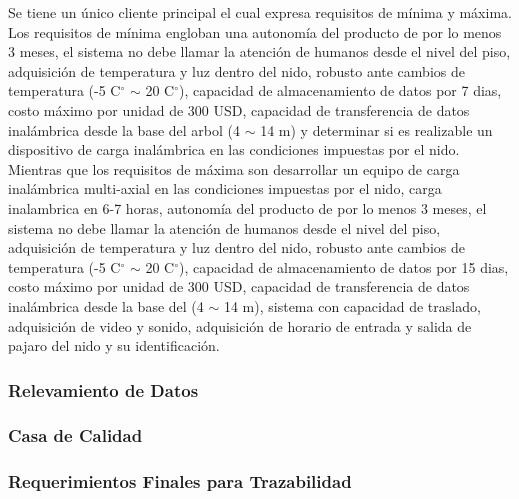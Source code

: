 Se tiene un único cliente principal el cual expresa requisitos de mínima y máxima. Los requisitos de mínima engloban una autonomía del producto de por lo menos 3 meses, el sistema no debe llamar la atención de humanos desde el nivel del piso, adquisición de temperatura y luz dentro del nido, robusto ante cambios de temperatura (-5 C$^{\circ}$ $\sim$ 20 C$^{\circ}$), capacidad de almacenamiento de datos por 7 dias, costo máximo por unidad de 300 USD, capacidad de transferencia de datos inalámbrica desde la base del arbol (4 $\sim$ 14 m) y determinar si es realizable un dispositivo de carga inalámbrica en las condiciones impuestas por el nido. Mientras que los requisitos de máxima son 
desarrollar un equipo de carga inalámbrica multi-axial en las condiciones impuestas por el nido, carga inalambrica en 6-7 horas, autonomía del producto de por lo menos 3 meses, el sistema no debe llamar la atención de humanos desde el nivel del piso, adquisición de temperatura y luz dentro del nido, robusto ante cambios de temperatura (-5 C$^{\circ}$ $\sim$ 20 C$^{\circ}$), capacidad de almacenamiento de datos por 15 dias, costo máximo por unidad de 300 USD, capacidad de transferencia de datos inalámbrica desde la base del   (4 $\sim$ 14 m), sistema con capacidad de traslado, adquisición de video y sonido, adquisición de horario de entrada y salida de pajaro del nido y su identificación.

\subsubsection{Relevamiento de Datos}
\label{sec:RelevamientoDatos}


\subsubsection{Casa de Calidad}
\label{sec:CasaCalidad}


\subsubsection{Requerimientos Finales para Trazabilidad}
\label{sec:RequerimientosTrazabilidad}

